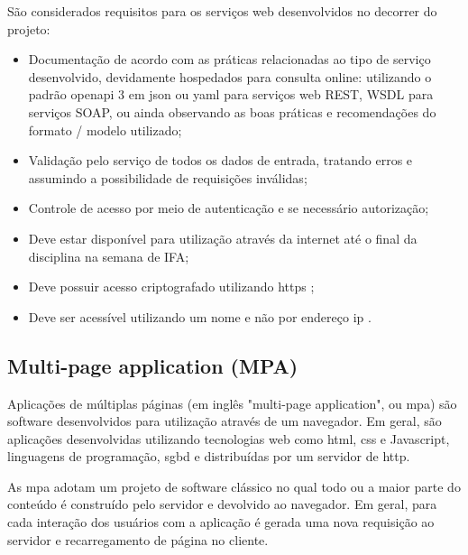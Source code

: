 São considerados requisitos para os serviços web desenvolvidos no decorrer do projeto: 

\begin{itemize}

    \item Documentação de acordo com as práticas relacionadas ao tipo de serviço desenvolvido, devidamente hospedados para consulta online: utilizando o padrão \gls{openapi} 3 em \ac{json} ou \ac{yaml} para serviços web REST, WSDL para serviços SOAP, ou ainda observando as boas práticas e recomendações do formato / modelo utilizado;
    
    \item Validação pelo serviço de todos os dados de entrada, tratando erros e assumindo a possibilidade de requisições inválidas;
    
    \item Controle de acesso por meio de autenticação e se necessário autorização;
    
    \item Deve estar disponível para utilização através da internet até o final da disciplina na semana de IFA;
    
    \item Deve possuir acesso criptografado utilizando \ac{https} ;
    
    \item Deve ser acessível utilizando um nome e não por endereço \ac{ip} .
  
\end{itemize}



\subsection{Multi-page application (MPA)}

Aplicações de múltiplas páginas (em inglês "multi-page application", ou \acs{mpa}) são software desenvolvidos para utilização através de um navegador. Em geral, são aplicações desenvolvidas utilizando tecnologias web como \ac{html}, \ac{css} e Javascript, linguagens de programação, \ac{sgbd} e distribuídas por um servidor de \ac{http}.

As \ac{mpa} adotam um projeto de software clássico no qual todo ou a maior parte do conteúdo é construído pelo servidor e devolvido ao navegador. Em geral, para cada interação dos usuários com a aplicação é gerada uma nova requisição ao servidor e recarregamento de página no cliente.

